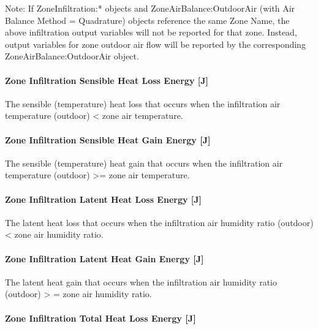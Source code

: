 Note: If ZoneInfiltration:* objects and ZoneAirBalance:OutdoorAir (with Air Balance Method = Quadrature) objects reference the same Zone Name, the above infiltration output variables will not be reported for that zone. Instead, output variables for zone outdoor air flow will be reported by the corresponding ZoneAirBalance:OutdoorAir object.

\paragraph{Zone Infiltration Sensible Heat Loss Energy {[}J{]}}\label{zone-infiltration-sensible-heat-loss-energy-j}

The sensible (temperature) heat loss that occurs when the infiltration air temperature (outdoor) \textless{} zone air temperature.

\paragraph{Zone Infiltration Sensible Heat Gain Energy {[}J{]}}\label{zone-infiltration-sensible-heat-gain-energy-j}

The sensible (temperature) heat gain that occurs when the infiltration air temperature (outdoor) \textgreater{}= zone air temperature.

\paragraph{Zone Infiltration Latent Heat Loss Energy {[}J{]}}\label{zone-infiltration-latent-heat-loss-energy-j}

The latent heat loss that occurs when the infiltration air humidity ratio (outdoor) \textless{} zone air humidity ratio.

\paragraph{Zone Infiltration Latent Heat Gain Energy {[}J{]}}\label{zone-infiltration-latent-heat-gain-energy-j}

The latent heat gain that occurs when the infiltration air humidity ratio (outdoor) \textgreater{} = zone air humidity ratio.

\paragraph{Zone Infiltration Total Heat Loss Energy {[}J{]}}\label{zone-infiltration-total-heat-loss-energy-j}

